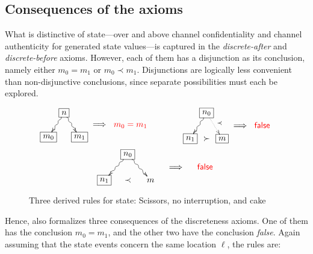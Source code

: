 
\subsection{Consequences of the axioms}
\label{sec:channels:state:consequences}

What is distinctive of state---over and above channel confidentiality
and channel authenticity for generated state values---is captured in
the \emph{discrete-after} and \emph{discrete-before} axioms.  However,
each of them has a disjunction as its conclusion, namely either
$m_0=m_1$ or $m_0\prec m_1$.  Disjunctions are logically less
convenient than non-disjunctive conclusions, since separate
possibilities must each be explored.
%
\begin{figure}
  \centering\[ \xymatrix@R=1mm@C=1mm{&
      *+[F]{n}\ar@{~>}[ddl]\ar@{~>}[ddr] & \\
      & & & \Longrightarrow &  \textcolor{red}{m_0=m_1}  \\
      *+[F]{m_0} & & *+[F]{m_1}} \qquad\qquad
    \xymatrix@R=1mm@C=1mm{&
      *+[F]{n_0}\ar@{~>}[ddl]\ar@{.>}[ddr]^{\prec} & \\
      & & & \Longrightarrow &  \textcolor{red}{\mathsf{false}}  \\
      *+[F]{n_1} &\succ & *+[F]{m}}
  \]
  \[ \xymatrix@R=1mm@C=4mm{&
      *+[F]{n_0}\ar@{~>}[ddl]\ar@{~>}[ddr] & \\
      & & & \Longrightarrow &  \textcolor{red}{\mathsf{false}}  \\
      *+[F]{n_1} &\prec & {m}}
  \]
  \caption{Three derived rules for state:  Scissors, no interruption,
    and cake}
  \label{fig:derived:state:rules}
\end{figure}
%
Hence, {\cpsa} also formalizes three consequences of the discreteness
axioms.  One of them has the conclusion $m_0=m_1$, and the other two
have the conclusion \emph {false}.  Again assuming that the state
events concern the same location $\ell$, the rules are:
%
